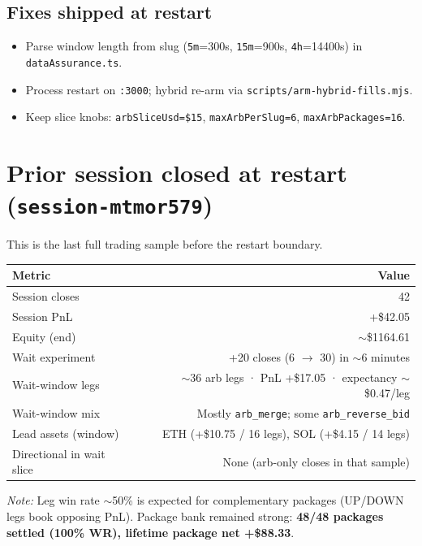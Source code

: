 \documentclass[11pt,a4paper]{article}
\begin{document}
\subsection{Fixes shipped at restart}
\begin{itemize}[leftmargin=*,itemsep=0.25em]
  \item Parse window length from slug (\texttt{5m}=300s, \texttt{15m}=900s, \texttt{4h}=14400s) in \texttt{dataAssurance.ts}.
  \item Process restart on \texttt{:3000}; hybrid re-arm via \texttt{scripts/arm-hybrid-fills.mjs}.
  \item Keep slice knobs: \texttt{arbSliceUsd=\$15}, \texttt{maxArbPerSlug=6}, \texttt{maxArbPackages=16}.
\end{itemize}

\section{Prior session closed at restart (\texttt{session-mtmor579})}
This is the last full trading sample before the restart boundary.

\begin{table}[h]
\centering
\begin{tabular}{@{}lr@{}}
\toprule
\textbf{Metric} & \textbf{Value} \\
\midrule
Session closes & 42 \\
Session PnL & +\$42.05 \\
Equity (end) & $\sim$\$1164.61 \\
Wait experiment & +20 closes (6 $\rightarrow$ 30) in $\sim$6 minutes \\
Wait-window legs & $\sim$36 arb legs · PnL +\$17.05 · expectancy $\sim$\$0.47/leg \\
Wait-window mix & Mostly \texttt{arb\_merge}; some \texttt{arb\_reverse\_bid} \\
Lead assets (window) & ETH (+\$10.75 / 16 legs), SOL (+\$4.15 / 14 legs) \\
Directional in wait slice & None (arb-only closes in that sample) \\
\bottomrule
\end{tabular}
\end{table}

\noindent\textit{Note:} Leg win rate $\sim$50\% is expected for complementary packages (UP/DOWN legs book opposing PnL). Package bank remained strong: \textbf{48/48 packages settled (100\% WR), lifetime package net +\$88.33}.
\end{document}
